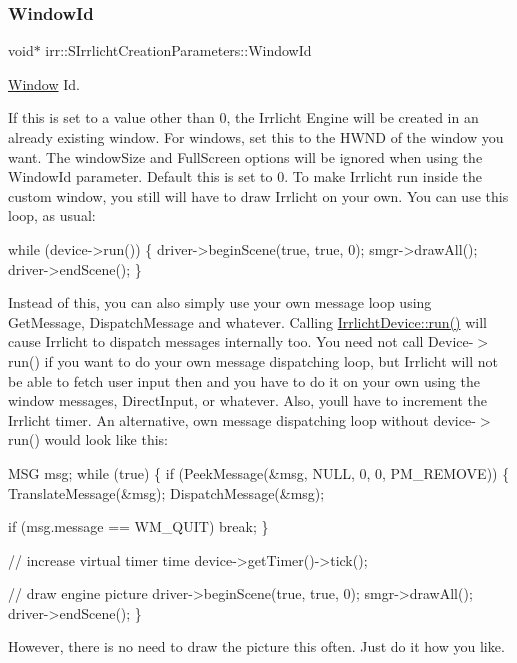 \subsubsection{\texorpdfstring{Window\+Id}{WindowId}}
{\footnotesize\ttfamily void$\ast$ irr\+::\+S\+Irrlicht\+Creation\+Parameters\+::\+Window\+Id}



\hyperlink{classWindow}{Window} Id. 

If this is set to a value other than 0, the Irrlicht Engine will be created in an already existing window. For windows, set this to the H\+W\+ND of the window you want. The window\+Size and Full\+Screen options will be ignored when using the Window\+Id parameter. Default this is set to 0. To make Irrlicht run inside the custom window, you still will have to draw Irrlicht on your own. You can use this loop, as usual\+: 
\begin{DoxyCode}
\textcolor{keywordflow}{while} (device->run())
\{
    driver->beginScene(\textcolor{keyword}{true}, \textcolor{keyword}{true}, 0);
    smgr->drawAll();
    driver->endScene();
\}
\end{DoxyCode}
 Instead of this, you can also simply use your own message loop using Get\+Message, Dispatch\+Message and whatever. Calling \hyperlink{classirr_1_1IrrlichtDevice_a0489f8151dc43f6f41503ffb5a160b35}{Irrlicht\+Device\+::run()} will cause Irrlicht to dispatch messages internally too. You need not call Device-\/$>$run() if you want to do your own message dispatching loop, but Irrlicht will not be able to fetch user input then and you have to do it on your own using the window messages, Direct\+Input, or whatever. Also, you\textquotesingle{}ll have to increment the Irrlicht timer. An alternative, own message dispatching loop without device-\/$>$run() would look like this\+: 
\begin{DoxyCode}
MSG msg;
\textcolor{keywordflow}{while} (\textcolor{keyword}{true})
\{
    \textcolor{keywordflow}{if} (PeekMessage(&msg, NULL, 0, 0, PM\_REMOVE))
    \{
        TranslateMessage(&msg);
        DispatchMessage(&msg);

        \textcolor{keywordflow}{if} (msg.message == WM\_QUIT)
            \textcolor{keywordflow}{break};
    \}

    \textcolor{comment}{// increase virtual timer time}
    device->getTimer()->tick();

    \textcolor{comment}{// draw engine picture}
    driver->beginScene(\textcolor{keyword}{true}, \textcolor{keyword}{true}, 0);
    smgr->drawAll();
    driver->endScene();
\}
\end{DoxyCode}
 However, there is no need to draw the picture this often. Just do it how you like. \mbox{\label{structirr_1_1SIrrlichtCreationParameters_acae5b5e41cec776aa4d05a03f16c57f2}} 
